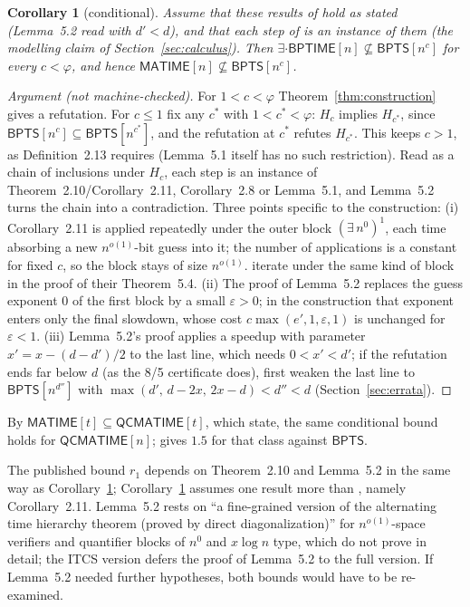 \documentclass[11pt]{article}
\newtheorem{corollary}[theorem]{Corollary}
\theoremstyle{definition}
\newcommand{\BPTS}{\mathsf{BPTS}}
\newcommand{\BPTIME}{\mathsf{BPTIME}}
\newcommand{\MATIME}{\mathsf{MATIME}}
\newcommand{\QCMATIME}{\mathsf{QCMATIME}}
\newcommand{\leanus}{\textunderscore\allowbreak}
\newcommand{\lean}[1]{\ifmmode\text{\ttfamily #1}\else{\ttfamily\let\_\leanus #1}\fi}
\begin{document}
\begin{corollary}[conditional]\label{cor:lb}
Assume that these results of \cite{MW21} hold as stated (Lemma~5.2 read with $d'<d$), and that each step of \lean{MWL.Step} is an instance of them (the modelling claim of Section~\ref{sec:calculus}). Then $\exists\cdot\BPTIME[n]\not\subseteq\BPTS[n^c]$ for every $c<\varphi$, and hence $\MATIME[n]\not\subseteq\BPTS[n^c]$.
\end{corollary}
\begin{proof}[Argument (not machine-checked)]
For $1<c<\varphi$ Theorem~\ref{thm:construction} gives a refutation. For $c\le1$ fix any $c^*$ with $1<c^*<\varphi$: $H_c$ implies $H_{c^*}$, since $\BPTS[n^c]\subseteq\BPTS[n^{c^*}]$, and the refutation at $c^*$ refutes $H_{c^*}$. This keeps $c>1$, as Definition~2.13 requires (Lemma~5.1 itself has no such restriction). Read as a chain of inclusions under $H_c$, each step is an instance of Theorem~2.10/Corollary~2.11, Corollary~2.8 or Lemma~5.1, and Lemma~5.2 turns the chain into a contradiction. Three points specific to the construction: (i) Corollary~2.11 is applied repeatedly under the outer block $(\exists\,n^0)^1$, each time absorbing a new $n^{o(1)}$-bit guess into it; the number of applications is a constant for fixed $c$, so the block stays of size $n^{o(1)}$. \cite{MW21} iterate under the same kind of block in the proof of their Theorem~5.4. (ii) The proof of Lemma~5.2 replaces the guess exponent $0$ of the first block by a small $\varepsilon>0$; in the construction that exponent enters only the final slowdown, whose cost $c\max(e',1,\varepsilon,1)$ is unchanged for $\varepsilon<1$. (iii) Lemma~5.2's proof applies a speedup with parameter $x'=x-(d-d')/2$ to the last line, which needs $0<x'<d'$; if the refutation ends far below $d$ (as the 8/5 certificate does), first weaken the last line to $\BPTS[n^{d''}]$ with $\max(d',\,d-2x,\,2x-d)<d''<d$ (Section~\ref{sec:errata}).
\end{proof}

By $\MATIME[t]\subseteq\QCMATIME[t]$, which \cite[\S1.3]{MW21} state, the same conditional bound holds for $\QCMATIME[n]$; \cite[Main Theorem~3]{MW21} gives $1.5$ for that class against $\BPTS$.

The published bound $r_1$ depends on Theorem~2.10 and Lemma~5.2 in the same way as Corollary~\ref{cor:lb}; Corollary~\ref{cor:lb} assumes one result more than \cite[Theorem~5.3]{MW21}, namely Corollary~2.11. Lemma~5.2 rests on ``a fine-grained version of the alternating time hierarchy theorem (proved by direct diagonalization)'' for $n^{o(1)}$-space verifiers and quantifier blocks of $n^0$ and $x\log n$ type, which \cite{MW21} do not prove in detail; the ITCS version defers the proof of Lemma~5.2 to the full version. If Lemma~5.2 needed further hypotheses, both bounds would have to be re-examined.
\end{document}
